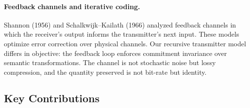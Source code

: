 \documentclass[11pt,a4paper]{article}
\begin{document}
\paragraph{Feedback channels and iterative coding.}
Shannon (1956) and Schalkwijk--Kailath (1966) analyzed feedback channels in which the receiver's output informs the transmitter's next input. These models optimize error correction over physical channels. Our recursive transmitter model differs in objective: the feedback loop enforces commitment invariance over semantic transformations. The channel is not stochastic noise but lossy compression, and the quantity preserved is not bit-rate but identity.

\subsection{Key Contributions}
\end{document}
